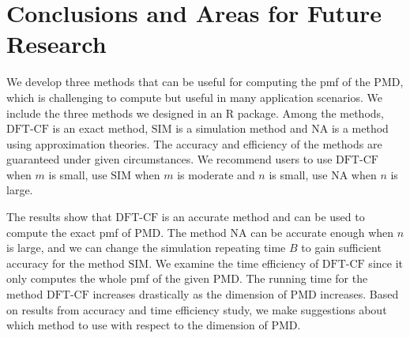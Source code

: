 \documentclass[12pt]{article}
\newcommand{\PMD}{\textrm{PMD}}
\newcommand{\SIM}{{\textrm{SIM}}}
\newcommand{\NA}{{\textrm{NA}}}
\newcommand{\dft}{{\textrm{DFT-CF}}}
\begin{document}



\section{Conclusions and Areas for Future Research}\label{sec:conclusion}

We develop three methods that can be useful for computing the pmf of the PMD, which is challenging to compute but useful in many application scenarios. We include the three methods we designed in an R package. Among the methods, $\dft$ is an exact method, $\SIM$ is a simulation method and $\NA$ is a method using approximation theories. The accuracy and efficiency of the methods are guaranteed under given circumstances. We recommend users to use $\dft$ when $m$ is small, use $\SIM$ when $m$ is moderate and $n$ is small, use $\NA$ when $n$ is large.


The results show that $\dft$ is an accurate method and can be used to compute the exact pmf of $\PMD$. The method $\NA$ can be accurate enough when $n$ is large, and we can change the simulation repeating time $B$ to gain sufficient accuracy for the method $\SIM$. We examine the time efficiency of $\dft$ since it only computes the whole pmf of the given $\PMD$. The running time for the method $\dft$ increases drastically as the dimension of $\PMD$ increases. Based on results from accuracy and time efficiency study, we make suggestions about which method to use with respect to the dimension of $\PMD$.
\end{document}
